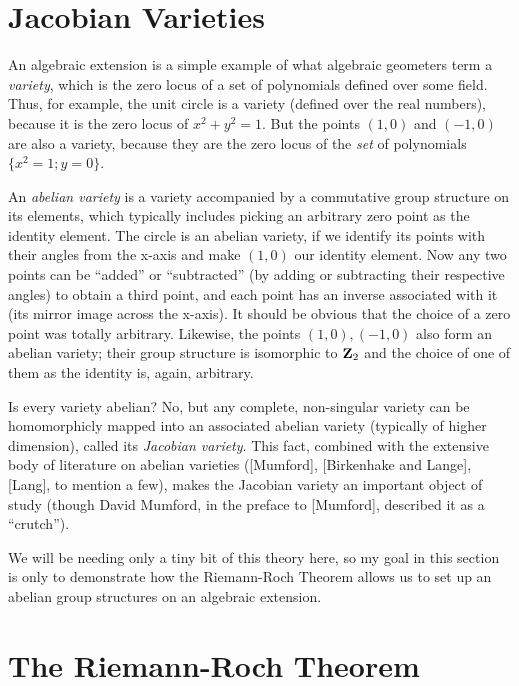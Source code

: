 \endexample

\section{Jacobian Varieties}

An algebraic extension is a simple example of what algebraic geometers
term a {\it variety}, which is the zero locus of a set of polynomials
defined over some field.  Thus, for example, the unit circle is a
variety (defined over the real numbers), because it is the zero locus
of $x^2+y^2=1$.  But the points $(1,0)$ and $(-1,0)$ are also a
variety, because they are the zero locus of the {\it set} of
polynomials $\{x^2=1; y=0\}$.

An {\it abelian variety} is a variety accompanied by a commutative
group structure on its elements, which typically includes picking an
arbitrary zero point as the identity element.  The circle is an
abelian variety, if we identify its points with their angles from the
x-axis and make $(1,0)$ our identity element.  Now any two points can
be ``added'' or ``subtracted'' (by adding or subtracting their
respective angles) to obtain a third point, and each point has an
inverse associated with it (its mirror image across the x-axis).  It
should be obvious that the choice of a zero point was totally
arbitrary.  Likewise, the points ${(1,0), (-1,0)}$ also form an
abelian variety; their group structure is isomorphic to ${\bf Z}_2$ and
the choice of one of them as the identity is, again, arbitrary.

Is every variety abelian?  No, but any complete, non-singular variety
can be homomorphicly mapped into an associated abelian variety
(typically of higher dimension), called its {\it Jacobian variety}.
This fact, combined with the extensive body of literature on abelian
varieties ([Mumford], [Birkenhake and Lange], [Lang], to mention a
few), makes the Jacobian variety an important object of study (though
David Mumford, in the preface to [Mumford], described it as a
``crutch'').

We will be needing only a tiny bit of this theory here, so my goal in
this section is only to demonstrate how the Riemann-Roch Theorem
allows us to set up an abelian group structures on an algebraic
extension.

\section{The Riemann-Roch Theorem}

